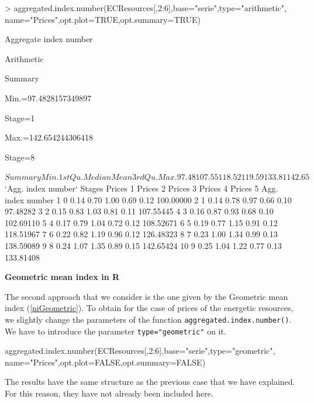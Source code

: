 \begin{example}
> aggregated.index.number(ECResources[,2:6],base="serie",type="arithmetic",
                          name="Prices",opt.plot=TRUE,opt.summary=TRUE)

Aggregate index number

Arithmetic

Summary

Min.=97.4828157349897

Stage=1

Max.=142.654244306418

Stage=8

$Summary
 Min. 1st Qu.  Median    Mean 3rd Qu.    Max. 
97.48  107.55  118.52  119.59  133.81  142.65 

$`Agg. index number`
   Stages Prices 1 Prices 2 Prices 3 Prices 4 Prices 5 Agg. index number
1       0     0.14     0.70     1.00     0.69     0.12         100.00000
2       1     0.14     0.78     0.97     0.66     0.10          97.48282
3       2     0.15     0.83     1.03     0.81     0.11         107.55445
4       3     0.16     0.87     0.93     0.68     0.10         102.69110
5       4     0.17     0.79     1.04     0.72     0.12         108.52671
6       5     0.19     0.77     1.15     0.91     0.12         118.51967
7       6     0.22     0.82     1.19     0.96     0.12         126.48323
8       7     0.23     1.00     1.34     0.99     0.13         138.59089
9       8     0.24     1.07     1.35     0.89     0.15         142.65424
10      9     0.25     1.04     1.22     0.77     0.13         133.81408
\end{example}



\vspace*{0.15 cm}\noindent\textbf{Geometric mean index in R}

\noindent The second approach that we consider is the one given by the Geometric mean index (\ref{niGeometric}).  To obtain for the case of prices of the energetic resources, we slightly change the parameters of the function \verb|aggregated.index.number()|. We have to introduce the parameter \verb|type="geometric"| on it. 
\begin{example}
aggregated.index.number(ECResources[,2:6],base="serie",type="geometric",
                        name="Prices",opt.plot=FALSE,opt.summary=FALSE)
\end{example}
The results have the same structure as the previous case that we have explained. For this reason, they have not already been included here.

